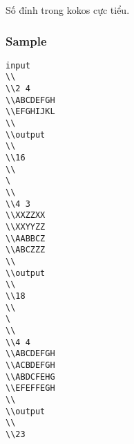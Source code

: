   Số đỉnh trong kokos cực tiểu.  

\subsubsection{   Sample  }
\begin{verbatim}
input 
\\ 
\\2 4 
\\ABCDEFGH 
\\EFGHIJKL 
\\ 
\\output 
\\ 
\\16
\\
\ 
\\ 
\\4 3 
\\XXZZXX 
\\XXYYZZ 
\\AABBCZ 
\\ABCZZZ 
\\ 
\\output 
\\ 
\\18
\\
\ 
\\ 
\\4 4 
\\ABCDEFGH 
\\ACBDEFGH 
\\ABDCFEHG 
\\EFEFFEGH 
\\ 
\\output 
\\ 
\\23\end{verbatim}



